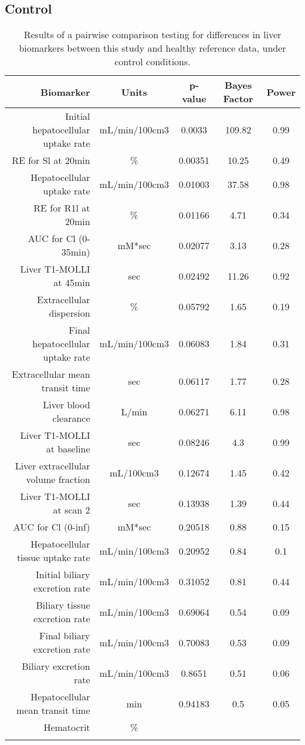 \documentclass{epflreport}%
\begin{document}
\subsection{Control}%
\label{subsec:Control}%

%
\begin{longtable}{rcccc}%
\hline%
Biomarker&Units&p{-}value&Bayes Factor&Power\\%
\hline%
Initial hepatocellular uptake rate&mL/min/100cm3&0.0033&109.82&0.99\\%
RE for Sl at 20min&\%&0.00351&10.25&0.49\\%
Hepatocellular uptake rate&mL/min/100cm3&0.01003&37.58&0.98\\%
RE for R1l at 20min&\%&0.01166&4.71&0.34\\%
AUC for Cl (0{-}35min)&mM*sec&0.02077&3.13&0.28\\%
Liver T1{-}MOLLI at 45min&sec&0.02492&11.26&0.92\\%
Extracellular dispersion&\%&0.05792&1.65&0.19\\%
Final hepatocellular uptake rate&mL/min/100cm3&0.06083&1.84&0.31\\%
Extracellular mean transit time&sec&0.06117&1.77&0.28\\%
Liver blood clearance&L/min&0.06271&6.11&0.98\\%
Liver T1{-}MOLLI at baseline&sec&0.08246&4.3&0.99\\%
Liver extracellular volume fraction&mL/100cm3&0.12674&1.45&0.42\\%
Liver T1{-}MOLLI at scan 2&sec&0.13938&1.39&0.44\\%
AUC for Cl (0{-}inf)&mM*sec&0.20518&0.88&0.15\\%
Hepatocellular tissue uptake rate&mL/min/100cm3&0.20952&0.84&0.1\\%
Initial biliary excretion rate&mL/min/100cm3&0.31052&0.81&0.44\\%
Biliary tissue excretion rate&mL/min/100cm3&0.69064&0.54&0.09\\%
Final biliary excretion rate&mL/min/100cm3&0.70083&0.53&0.09\\%
Biliary excretion rate&mL/min/100cm3&0.8651&0.51&0.06\\%
Hepatocellular mean transit time&min&0.94183&0.5&0.05\\%
Hematocrit&\%&&&\\%
\hline%
\caption{Results of a pairwise comparison testing for differences in liver biomarkers between this study and healthy reference data, under control conditions.} \\%
\end{longtable}%
\end{document}
